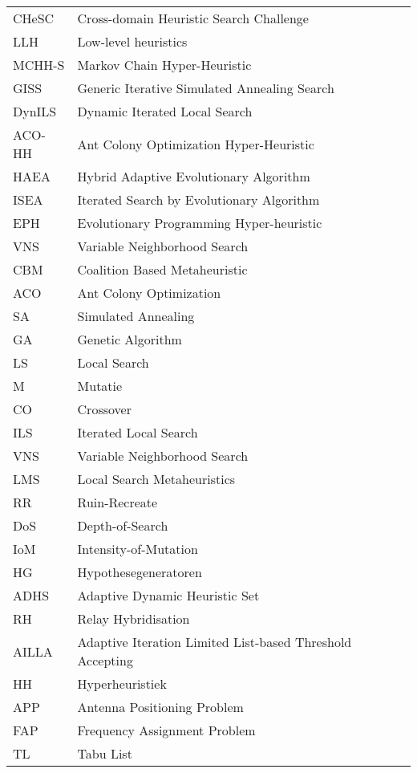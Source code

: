\begin{flushleft}
  \renewcommand{\arraystretch}{1.1}
  \begin{tabularx}{\textwidth}{@{}p{18mm}X@{}}%
    CHeSC	&Cross-domain Heuristic Search Challenge \\
    LLH		&Low-level heuristics \\
    MCHH-S	&Markov Chain Hyper-Heuristic\\
    GISS	&Generic Iterative Simulated Annealing Search\\
    DynILS	&Dynamic Iterated Local Search\\
    ACO-HH	&Ant Colony Optimization Hyper-Heuristic\\
    HAEA	&Hybrid Adaptive Evolutionary Algorithm\\
    ISEA	&Iterated Search by Evolutionary Algorithm\\
    EPH		&Evolutionary Programming Hyper-heuristic\\
    VNS		&Variable Neighborhood Search\\
    CBM		&Coalition Based Metaheuristic\\
    ACO		&Ant Colony Optimization\\
    SA		&Simulated Annealing\\
    GA		&Genetic Algorithm\\
    LS		&Local Search\\
    M		&Mutatie\\
    CO		&Crossover\\
    ILS		&Iterated Local Search\\
    VNS		&Variable Neighborhood Search\\
    LMS		&Local Search Metaheuristics\\
    RR		&Ruin-Recreate\\
    DoS		&Depth-of-Search\\
    IoM		&Intensity-of-Mutation\\
    HG		&Hypothesegeneratoren\\
    ADHS	&Adaptive Dynamic Heuristic Set\\
    RH		&Relay Hybridisation\\
    AILLA	&Adaptive Iteration Limited List-based Threshold Accepting\\
    HH		&Hyperheuristiek\\
    APP		&Antenna Positioning Problem\\
    FAP		&Frequency Assignment Problem\\
    TL		&Tabu List\\
  \end{tabularx}
\end{flushleft}